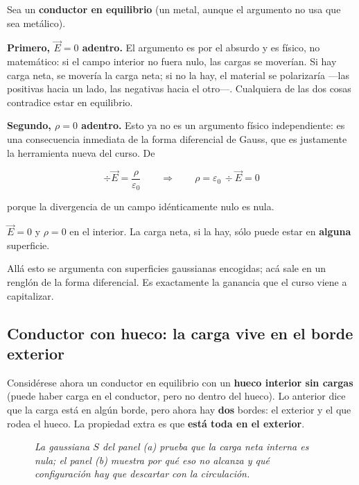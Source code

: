 \documentclass[12pt,a4paper]{article}
\begin{document}
Sea un \textbf{conductor en equilibrio} (un metal, aunque el argumento no usa que
sea metálico).

\textbf{Primero, $\vec E = 0$ adentro.} El argumento es por el absurdo y es
físico, no matemático: si el campo interior no fuera nulo, las cargas se
moverían. Si hay carga neta, se movería la carga neta; si no la hay, el material
se polarizaría ---las positivas hacia un lado, las negativas hacia el otro---.
Cualquiera de las dos cosas contradice estar en equilibrio.

\textbf{Segundo, $\rho = 0$ adentro.} Esto ya no es un argumento físico
independiente: es una consecuencia inmediata de la forma diferencial de Gauss,
que es justamente la herramienta nueva del curso. De

\[
\div \vec E = \frac{\rho}{\varepsilon_0}
\qquad\Longrightarrow\qquad
\rho = \varepsilon_0\,\div\vec E = 0
\]

porque la divergencia de un campo idénticamente nulo es nula.

\begin{keybox}
$\vec E = 0$ y $\rho = 0$ en el interior. La carga neta, si la hay, sólo puede
estar en \textbf{alguna} superficie.
\end{keybox}

\begin{notebox}
Allá esto se argumenta con superficies gaussianas encogidas; acá sale en un
renglón de la forma diferencial. Es exactamente la ganancia que el curso viene a
capitalizar.
\end{notebox}

\subsection{Conductor con hueco: la carga vive en el borde exterior}

Considérese ahora un conductor en equilibrio con un \textbf{hueco interior sin
cargas} (puede haber carga en el conductor, pero no dentro del hueco). Lo
anterior dice que la carga está en algún borde, pero ahora hay \textbf{dos}
bordes: el exterior y el que rodea el hueco. La propiedad extra es que
\textbf{está toda en el exterior}.

\begin{figure}[H]
  \centering
  
  \caption*{\small\itshape La gaussiana $S$ del panel (a) prueba que la carga neta
  interna es nula; el panel (b) muestra por qué eso no alcanza y qué configuración
  hay que descartar con la circulación.}
\end{figure}
\end{document}
